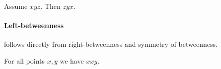 \documentclass[10pt,a4paper,parskip=half,numbers=endperiod,headings=standardclasses,parskip]{scrartcl}
\newcommand{\Betw}[3]{#1 #2 #3}
\begin{document}
  \begin{forthel}
    \begin{lemma} %
      Assume $\Betw{x}{y}{z}$. Then $\Betw{z}{y}{x}$.
    \end{lemma}
  \end{forthel}

  \paragraph{Left-betweenness} follows directly
  from right-betweenness and symmetry of betweenness.
  \begin{forthel}
    \begin{lemma} %
      For all points $x, y$ we have  $\Betw{x}{x}{y}$.
    \end{lemma}
  \end{forthel}
\end{document}
